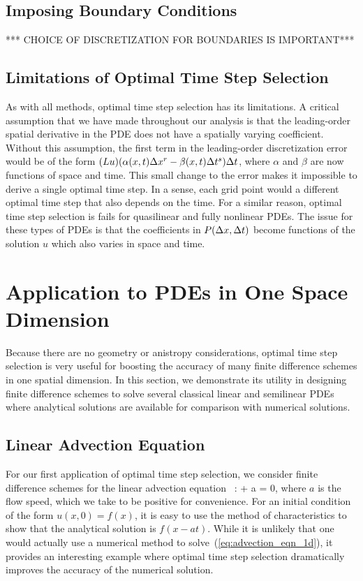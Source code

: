 \documentclass[oneeqnum,onefignum,onetabnum,onethmnum]{siamltex}
\begin{document}
\subsection{Imposing Boundary Conditions}
*** CHOICE OF DISCRETIZATION FOR BOUNDARIES IS IMPORTANT***


\subsection{Limitations of Optimal Time Step Selection}
As with all methods, optimal time step selection has its limitations.
A critical assumption that we have made throughout our analysis is that
the leading-order spatial derivative in the PDE does not have a spatially
varying coefficient.  Without this assumption, the first term in the
leading-order discretization error would be of the form 
$(L u) (\alpha(x,t) \Delta x^r - \beta(x,t) \Delta t^s) \Delta t$,
where $\alpha$ and $\beta$ are now functions of space and time.  This
small change to the error makes it impossible to derive a single optimal
time step.  In a sense, each grid point would a different optimal time
step that also depends on the time.  For a similar reason, optimal time step 
selection is fails for quasilinear and fully nonlinear PDEs.  The issue for 
these types of PDEs is that the coefficients in $P(\Delta x, \Delta t)$ become 
functions of the solution $u$ which also varies in space and time.


\section{\label{sec:applications_1d} 
         Application to PDEs in One Space Dimension}
Because there are no geometry or anistropy considerations, optimal time step 
selection is very useful for boosting the accuracy of many finite difference 
schemes in one spatial dimension.  In this section, we demonstrate its 
utility in designing finite difference schemes to solve several classical 
linear and semilinear PDEs where analytical solutions are available for 
comparison with numerical solutions.


\subsection{Linear Advection Equation}
For our first application of optimal time step selection, we consider 
finite difference schemes for the linear advection equation
~\cite{leveque_book_1992, leveque_book_2002, gko_book}:
\beq
   + a  = 0,
  \label{eq:advection_eqn_1d}
\eeq
where $a$ is the flow speed, which we take to be positive for convenience.  
For an initial condition of the form $u(x,0) = f(x)$, it is easy to use the 
method of characteristics to show that the analytical solution is $f(x-at)$.  
While it is unlikely that one would actually use a numerical method to 
solve~(\ref{eq:advection_eqn_1d}), it provides an interesting example where 
optimal time step selection dramatically improves the accuracy of the 
numerical solution.
\end{document}
